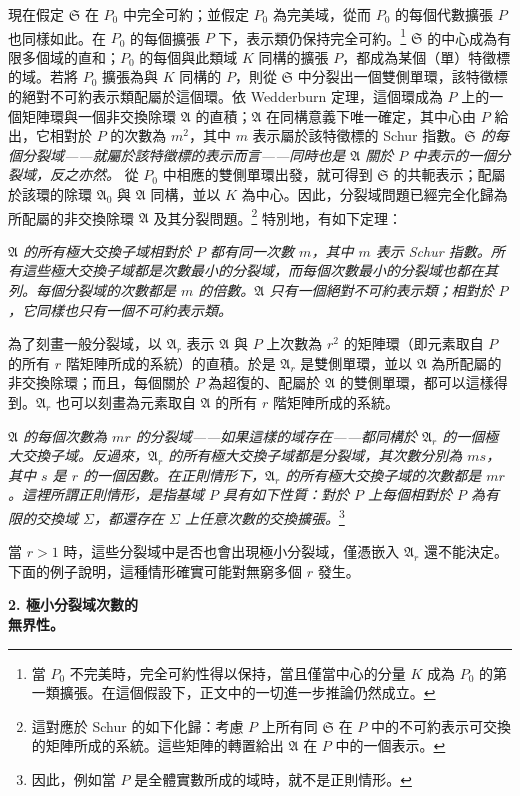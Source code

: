 \documentclass[11pt]{article}
\providecommand{\srcspaced}[1]{\emph{#1}}
\providecommand{\mS}{\mathfrak{S}}
\providecommand{\mA}{\mathfrak{A}}
\begin{document}
現在假定 $\mS$ 在 $P_0$ 中完全可約；並假定 $P_0$ 為完美域，從而 $P_0$ 的每個代數擴張 $P$ 也同樣如此。在 $P_0$ 的每個擴張 $P$ 下，表示類仍保持完全可約。\footnote{當 $P_0$ 不完美時，完全可約性得以保持，當且僅當中心的分量 $K$ 成為 $P_0$ 的\guillemotright{}第一類擴張\guillemotleft{}。在這個假設下，正文中的一切進一步推論仍然成立。} $\mS$ 的中心成為有限多個域的直和；$P_0$ 的每個與此類域 $K$ 同構的擴張 $P$，都成為某個（單）特徵標的域。若將 $P_0$ 擴張為與 $K$ 同構的 $P$，則從 $\mS$ 中分裂出一個雙側單環，該特徵標的絕對不可約表示類配屬於這個環。依 Wedderburn 定理，這個環成為 $P$ 上的一個矩陣環與一個非交換除環 $\mA$ 的直積；$\mA$ 在同構意義下唯一確定，其中心由 $P$ 給出，它相對於 $P$ 的次數為 $m^2$，其中 $m$ 表示屬於該特徵標的 Schur 指數。\srcspaced{$\mS$ 的每個分裂域——就屬於該特徵標的表示而言——同時也是 $\mA$ 關於 $P$ 中表示的一個分裂域，反之亦然。} 從 $P_0$ 中相應的雙側單環出發，就可得到 $\mS$ 的共軛表示；配屬於該環的除環 $\mA_0$ 與 $\mA$ 同構，並以 $K$ 為中心。因此，分裂域問題已經完全化歸為所配屬的非交換除環 $\mA$ 及其分裂問題。\footnote{這對應於 Schur 的如下化歸：考慮 $P$ 上所有同 $\mS$ 在 $P$ 中的不可約表示可交換的矩陣所成的系統。這些矩陣的轉置給出 $\mA$ 在 $P$ 中的一個表示。} 特別地，有如下定理：

\srcspaced{$\mA$ 的所有極大交換子域相對於 $P$ 都有同一次數 $m$，其中 $m$ 表示 Schur 指數。所有這些極大交換子域都是次數最小的分裂域，而每個次數最小的分裂域也都在其列。每個分裂域的次數都是 $m$ 的倍數。$\mA$ 只有一個絕對不可約表示類；相對於 $P$，它同樣也只有一個不可約表示類。}

為了刻畫一般分裂域，以 $\mA_r$ 表示 $\mA$ 與 $P$ 上次數為 $r^2$ 的矩陣環（即元素取自 $P$ 的所有 $r$ 階矩陣所成的系統）的直積。於是 $\mA_r$ 是雙側單環，並以 $\mA$ 為所配屬的非交換除環；而且，每個關於 $P$ 為超復的、配屬於 $\mA$ 的雙側單環，都可以這樣得到。$\mA_r$ 也可以刻畫為元素取自 $\mA$ 的所有 $r$ 階矩陣所成的系統。

\srcspaced{$\mA$ 的每個次數為 $mr$ 的分裂域——如果這樣的域存在——都同構於 $\mA_r$ 的一個極大交換子域。反過來，$\mA_r$ 的所有極大交換子域都是分裂域，其次數分別為 $ms$，其中 $s$ 是 $r$ 的一個因數。在正則情形下，$\mA_r$ 的所有極大交換子域的次數都是 $mr$。這裡所謂正則情形，是指基域 $P$ 具有如下性質：對於 $P$ 上每個相對於 $P$ 為有限的交換域 $\Sigma$，都還存在 $\Sigma$ 上任意次數的交換擴張。}\footnote{因此，例如當 $P$ 是全體實數所成的域時，就不是正則情形。}

當 $r>1$ 時，這些分裂域中是否也會出現極小分裂域，僅憑嵌入 $\mA_r$ 還不能決定。下面的例子說明，這種情形確實可能對無窮多個 $r$ 發生。

\begin{center}
\textbf{2. 極小分裂域次數的\\
無界性。}
\end{center}
\end{document}
